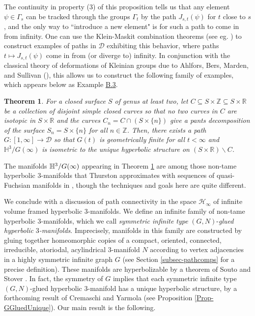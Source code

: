 \documentclass[11pt,leqno]{article}
\newtheorem{introtheorem}{Theorem}
\theoremstyle{introdef}
\numberwithin{lemma}{section}
\theoremstyle{definition}
\newcommand{\R}{\mathbb{R}}
\newcommand{\Z}{\mathbb{Z}}
\begin{document}
The continuity in property (3) of this proposition tells us that any element $\psi\in\Gamma_s$ can be tracked through the groups $\Gamma_t$ by the path $J_{s,t}(\psi)$ for $t$ close to $s$, and the only way to ``introduce a new element" is for such a path to come in from infinity. One can use the Klein-Maskit combination theorems (see eg. \cite{MAT}) to construct examples of paths in $\mathcal{D}$ exhibiting this behavior, where paths $t\mapsto J_{s,t}(\psi)$ come in from (or diverge to) infinity. In conjunction with the classical theory of deformations of Kleinian groups due to Ahlfors, Bers, Marden, and Sullivan (\cite{MAT}), this allows us to construct the following family of examples, which appears below as Example \hyperlink{Ex-NonTame}{B.3}.

\begin{introtheorem}
\label{introthm-NonTameLimit}
    For a closed surface $S$ of genus at least two, let $C\subseteq S\times\Z\subseteq S\times \R$ be a collection of disjoint simple closed curves so that no two curves in $C$ are isotopic in $S\times \R$ and the curves $C_n=C\cap(S\times\{n\})$ give a pants decomposition of the surface $S_n=S\times\{n\}$ for all $n\in \Z$. Then, there exists a path $G:[1,\infty]\rightarrow\mathcal{D}$ so that $G(t)$ is geometrically finite for all $t<\infty$ and $\mathbb{H}^3/G(\infty)$ is isometric to the unique hyperbolic structure on $(S\times \R)\backslash C$.
\end{introtheorem}

The manifolds $\mathbb H^3 / G(\infty)$ appearing in Theorem \ref{introthm-NonTameLimit} are among those non-tame hyperbolic $3$-manifolds that Thurston approximates with sequences of quasi-Fuchsian manifolds in \cite[Section 7]{THUII}, though the techniques and goals here are quite different.\par

We conclude with a discussion of path connectivity in the space $\mathcal{H}_\infty$ of infinite volume framed hyperbolic $3$-manifolds. We define an infinite family of non-tame hyperbolic $3$-manifolds, which we call \textit{symmetric infinite type }$(G,N)$-\textit{glued hyperbolic }$3$\textit{-manifolds}. Imprecisely, manifolds in this family are constructed by gluing together homeomorphic copies of a compact, oriented, connected, irreducible, atoriodal, acylindrical $3$-manifold $N$ according to vertex adjacencies in a highly symmetric infinite graph $G$ (see Section \ref{subsec-pathcomps} for a precise definition). These manifolds are hyperbolizable by a theorem of Souto and Stover \cite{SOUSTO}. In fact, the symmetry of $G$ implies that each symmetric infinite type $(G,N)$-glued hyperbolic $3$-manifold has a unique hyperbolic structure, by a forthcoming result of Cremaschi and Yarmola \cite{CREMYAR} (see Proposition \ref{Prop-GGluedUnique}). Our main result is the following.
\end{document}
